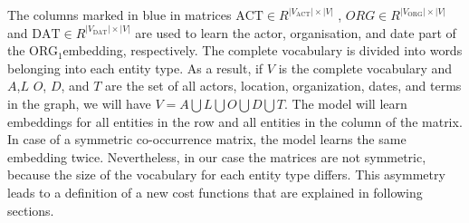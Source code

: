 The columns marked in blue in matrices $\mathrm{ACT}\in R^{|V_{\mathrm{ACT}}|\times |V|}$ , $ORG\in R^{|V_{\mathrm{ORG}}|\times |V|}$  and $\mathrm{DAT}\in R^{|V_{\mathrm{DAT}}|\times |V|}$ are used to learn the actor, organisation, and date part of the ORG$_1$embedding, respectively. The complete vocabulary is divided into words belonging into each entity type. As a result, if $V$ is the complete vocabulary and $A$,$L$ $O$, $D$, and $T$ are the set of all actors, location, organization, dates, and terms in the graph, we will have $V=A \bigcup L \bigcup O \bigcup D \bigcup T$. The model will learn embeddings for all entities in the row and all entities in the column of the matrix. In case of a symmetric co-occurrence matrix, the model learns the same embedding twice. Nevertheless, in our case the matrices are not symmetric, because the size of the vocabulary for each entity type differs. This asymmetry leads to a definition of a new cost functions that are explained in following sections. 
